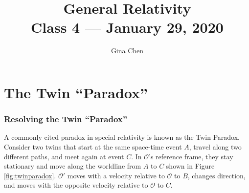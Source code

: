 \documentclass[11pt]{article}
\title{{\Huge General Relativity}\\{\Large{Class 4 --- January 29, 2020}}} %
\author{Gina Chen}
\begin{document}
\maketitle
\flushbottom
\newpage
\pagestyle{fancynotes}

\part{The Twin ``Paradox''}
\section{Resolving the Twin ``Paradox''}
A commonly cited paradox in special relativity is known as the Twin Paradox. Consider two twins that start at the same space-time event $A$, travel along two different paths, and meet again at event $C$. In $\mathcal{O}$'s reference frame, they stay stationary and move along the worldline from $A$ to $C$ shown in Figure \ref{fig:twinparadox}. $\mathcal{O}'$ moves with a velocity relative to $\mathcal{O}$ to $B$, changes direction, and moves with the opposite velocity relative to $\mathcal{O}$ to $C$.
\end{document}
